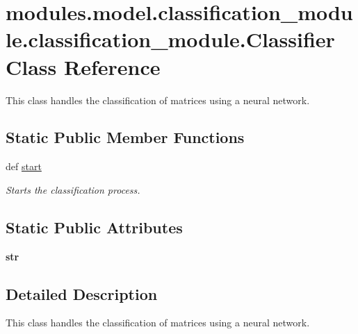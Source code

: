 \hypertarget{classmodules_1_1model_1_1classification__module_1_1classification__module_1_1_classifier}{}\section{modules.\+model.\+classification\+\_\+module.\+classification\+\_\+module.\+Classifier Class Reference}
\label{classmodules_1_1model_1_1classification__module_1_1classification__module_1_1_classifier}


This class handles the classification of matrices using a neural network.  


\subsection*{Static Public Member Functions}
\begin{DoxyCompactItemize}
\item 
def \mbox{\hyperlink{classmodules_1_1model_1_1classification__module_1_1classification__module_1_1_classifier_a0171fa6530689c47b0bfda8bdadd986a}{start}}
\begin{DoxyCompactList}\small\item\em Starts the classification process. \end{DoxyCompactList}\end{DoxyCompactItemize}
\subsection*{Static Public Attributes}
\begin{DoxyCompactItemize}
\item 
\mbox{\label{classmodules_1_1model_1_1classification__module_1_1classification__module_1_1_classifier_ae356d5f32bfe960c491f7141d67a5899}} 
{\bfseries str}
\end{DoxyCompactItemize}


\subsection{Detailed Description}
This class handles the classification of matrices using a neural network. 

